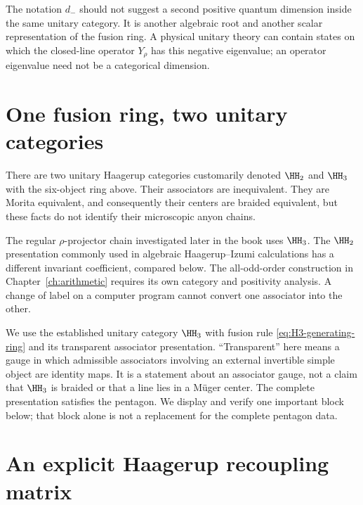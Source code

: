 The notation $d_-$ should not suggest a second positive quantum
dimension inside the same unitary category.  It is another algebraic
root and another scalar representation of the fusion ring.  A physical
unitary theory can contain states on which the closed-line operator
$Y_\rho$ has this negative
eigenvalue; an operator eigenvalue need not be a categorical dimension.

\section{One fusion ring, two unitary categories}

There are two unitary Haagerup categories customarily denoted
$\HH_2$ and $\HH_3$ with the six-object ring above.  Their associators
are inequivalent.  They are Morita equivalent, and consequently their
centers are braided equivalent, but these facts do not identify their
microscopic anyon chains.

The regular $\rho$-projector chain investigated later in the book uses
$\HH_3$. The $\HH_2$ presentation commonly used in algebraic
Haagerup--Izumi calculations has a different invariant coefficient,
compared below. The all-odd-order construction in
Chapter~\ref{ch:arithmetic} requires its own category and positivity
analysis. A change of label on a computer program cannot convert
one associator into the other.

\begin{constructioninput}
We use the established unitary category $\HH_3$ with fusion rule
\eqref{eq:H3-generating-ring} and its transparent associator
presentation.  ``Transparent'' here means a gauge in which admissible
associators involving an external invertible simple object are
identity maps.  It is a statement about an associator gauge, not a
claim that $\HH_3$ is braided or that a line lies in a M\"uger center.
The complete presentation satisfies the pentagon.  We display and
verify one important block below; that block alone is not a
replacement for the complete pentagon data.
\end{constructioninput}

\section{An explicit Haagerup recoupling matrix}

